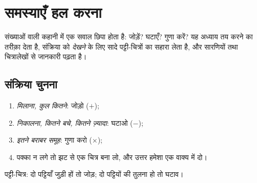 \chapter{समस्याएँ हल करना}\label{ch:g2:problems}

संख्याओं वाली कहानी में एक सवाल छिपा होता है: जोड़ें? घटाएँ?
गुणा करें? यह अध्याय तय करने का तरीक़ा देता है, संक्रिया को
\emph{देखने} के लिए सादे पट्टी-चित्रों का सहारा लेता है, और
सारणियों तथा चित्रालेखों से जानकारी पढ़ता है।

\section{संक्रिया चुनना}

\begin{method}[कौन-सी संक्रिया?]\label{met:g2:problems:choose}
\begin{enumerate}
  \item \emph{मिलाना, कुल कितने}: जोड़ो ($+$);
  \item \emph{निकालना, कितने बचे, कितने ज़्यादा}: घटाओ
        ($-$);
  \item \emph{इतने बराबर समूह}: गुणा करो ($\times$);
  \item पक्का न लगे तो झट से एक चित्र बना लो, और उत्तर हमेशा
        एक वाक्य में दो।
\end{enumerate}
\end{method}

\begin{omfigure}

{\small पट्टी-चित्र: दो पट्टियाँ जुड़ी हों तो जोड़; दो पट्टियों
की तुलना हो तो घटाव।}
\end{omfigure}

